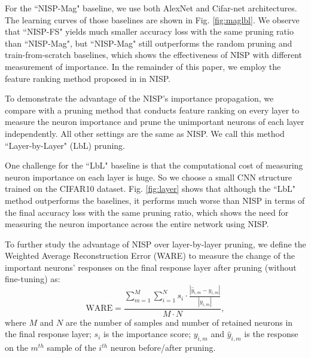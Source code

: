 \documentclass[10pt,twocolumn,letterpaper]{article}
\begin{document}
For the ``NISP-Mag" baseline, we use both AlexNet and Cifar-net architectures. The learning curves of those baselines are shown in Fig. \ref{fig:maglbl}. We observe that ``NISP-FS" yields much smaller accuracy loss with the same pruning ratio than ``NISP-Mag", but ``NISP-Mag" still outperforms the random pruning and train-from-scratch baselines, which shows the effectiveness of NISP with different measurement of importance. In the remainder of this paper, we employ the feature ranking method proposed in \cite{Roffo_2015_ICCV} in NISP.

To demonstrate the advantage of the NISP's importance propagation, we compare with a pruning method that conducts feature ranking on every layer to measure the neuron importance and prune the unimportant neurons of each layer independently. All other settings are the same as NISP. We call this method ``Layer-by-Layer"  (LbL) pruning.
  
One challenge for the ``LbL" baseline is that the computational cost of measuring neuron importance on each layer is huge. So we choose a small CNN structure trained on the CIFAR10 dataset. 
Fig. \ref{fig:layer} shows that although the ``LbL" method outperforms the baselines, it performs much worse than NISP in terms of the final accuracy loss with the same pruning ratio, which shows the need for measuring the neuron importance across the entire network using NISP.

To further study the advantage of NISP over layer-by-layer pruning, we define the Weighted Average Reconstruction Error (WARE) to measure the change of the important neurons' responses on the final response layer after pruning (without fine-tuning) as:
\begin{equation}
\text{WARE} = \frac{\sum_{m=1}^{M} \sum_{i=1}^{N} s_{i}\cdot \frac{|{\hat y}_{i,m}- y_{i,m}|}{|y_{i,m}|}}{M \cdot N},
\end{equation}
where $M$ and $N$ are the number of samples and number of retained neurons in the final response layer; $s_i$ is the importance score; $y_{i,m}$ and ${\hat y}_{i,m}$ is the response on the $m^{th}$ sample of the $i^{th}$ neuron before/after pruning. 
\end{document}
